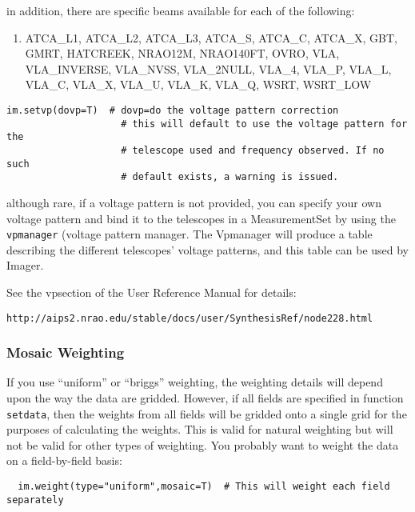 in addition, there are specific beams available for each of the following:

\begin{enumerate}
   \item ATCA\_L1, ATCA\_L2, ATCA\_L3, ATCA\_S, ATCA\_C, ATCA\_X, GBT, GMRT,
   HATCREEK, NRAO12M, NRAO140FT, OVRO, VLA, VLA\_INVERSE, VLA\_NVSS,
   VLA\_2NULL, VLA\_4, VLA\_P, VLA\_L, VLA\_C, VLA\_X, VLA\_U, VLA\_K, VLA\_Q,
   WSRT, WSRT\_LOW 
\end{enumerate}

\small
\begin{verbatim}
im.setvp(dovp=T)  # dovp=do the voltage pattern correction
                    # this will default to use the voltage pattern for the
                    # telescope used and frequency observed. If no such
                    # default exists, a warning is issued.
\end{verbatim}
\normalsize

although rare, if a voltage pattern is not provided, you can specify
your own voltage pattern and bind it to the telescopes in a
MeasurementSet by using the {\tt vpmanager} (voltage pattern
manager. The Vpmanager will produce a table describing the different
telescopes' voltage patterns, and this table can be used by Imager.
 
See the vpsection of the User Reference Manual for details: 
\small
\begin{verbatim}
http://aips2.nrao.edu/stable/docs/user/SynthesisRef/node228.html
\end{verbatim}
\normalsize

\subsubsection{Mosaic Weighting}
\label{section:imtool.mosaic.set.wt}

If you use ``uniform'' or ``briggs'' weighting, the weighting details
will depend upon the way the data are gridded.  However, if all fields
are specified in function {\tt setdata}, then the weights from all
fields will be gridded onto a single grid for the purposes of
calculating the weights.  This is valid for natural weighting but will
not be valid for other types of weighting.  You probably want to
weight the data on a field-by-field basis:


\small
\begin{verbatim}
  im.weight(type="uniform",mosaic=T)  # This will weight each field separately
\end{verbatim}
\normalsize

